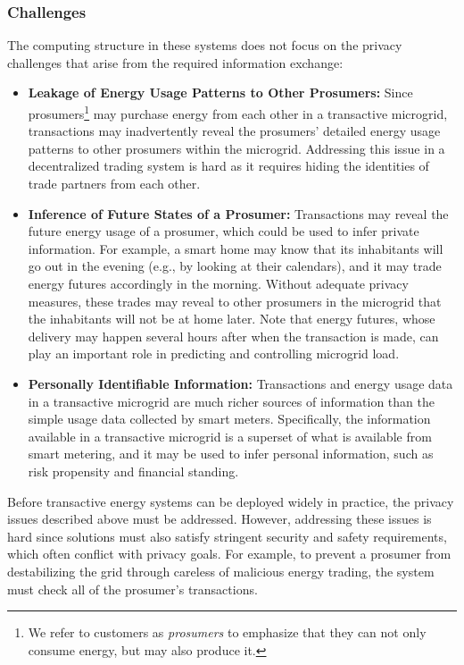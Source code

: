 \documentclass[12pt,letterpaper]{article}
\begin{document}
\subsubsection{Challenges}

The computing structure in these systems does not focus on the privacy challenges that arise from the
required information exchange:
\begin{itemize}
\item \textbf{Leakage of Energy Usage Patterns to Other Prosumers:} 
 Since prosumers\footnote{We
  refer to customers as \emph{prosumers} to emphasize that they can
  not only consume energy, but may also produce it.} may purchase
  energy from each other in a transactive microgrid, transactions may
  inadvertently reveal the prosumers' detailed energy usage patterns
  to other prosumers within the microgrid.  Addressing this issue in a
  decentralized trading system is hard as it requires hiding the
  identities of trade partners from each other. %

\item \textbf{Inference of Future States of a Prosumer:} 
  Transactions may reveal
  the future energy usage of a prosumer, which could be used to infer
  private information.  For example, a smart home may know that its
  inhabitants will go out in the evening (e.g., by looking at
  their calendars), and it may trade energy futures accordingly in the
  morning.  Without adequate privacy measures, these trades may reveal
  to other prosumers in the microgrid that the inhabitants will not be
  at home later.  Note that energy
  futures, whose delivery may happen several hours after when the
  transaction is made, can play an important role in predicting and
  controlling microgrid load.  %

\item \textbf{Personally Identifiable Information:} 
  Transactions and energy
  usage data in a transactive microgrid are much richer sources of
  information than the simple usage data collected by smart
  meters.  Specifically, the information available in a
  transactive microgrid is a superset of what is available from smart
  metering, and it may be used to infer personal information, such as
  risk propensity and financial standing.
\end{itemize}

Before transactive energy systems can be deployed widely in practice,
the privacy issues described above must be addressed. However, addressing these
issues is hard since solutions must also satisfy stringent security
and safety requirements, which often conflict with privacy goals.  For
example, to prevent a prosumer from destabilizing the grid through
careless of malicious energy trading, the system must check all of the
prosumer's transactions.  
\end{document}

